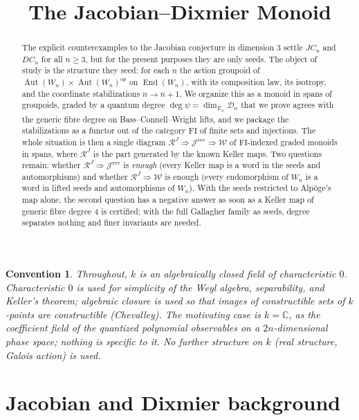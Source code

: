 \documentclass[11pt]{article}
\title{The Jacobian--Dixmier Monoid}
\theoremstyle{change}
\newtheorem{convention}[equation]{Convention}
\theoremstyle{nonumberplain}
\newcommand\cJ{{\mathcal J}}
\newcommand\cW{{\mathcal W}}
\newcommand\cR{{\mathcal R}}
\newcommand\cD{{\mathcal D}}
\newcommand\rev{{\mathrm{rev}}}
\newcommand\FI{{\mathrm{FI}}}
\DeclareMathOperator{\End}{End}
\DeclareMathOperator{\Aut}{Aut}
\begin{document}
\maketitle

\begin{abstract}
The explicit counterexamples to the Jacobian conjecture in dimension $3$ \cite{Alpoge,Speyer,Tao,fam} settle $JC_n$ and $DC_n$ for all $n \geq 3$, but for the present purposes they are only seeds. The object of study is the structure they seed: for each $n$ the action groupoid of $\Aut(W_n) \times \Aut(W_n)^{op}$ on $\End(W_n)$, with its composition law, its isotropy, and the coordinate stabilizations $n \to n+1$. We organize this as a monoid in spans of groupoids, graded by a quantum degree $\deg \psi = \dim_{E_\psi} \cD_n$ that we prove agrees with the generic fibre degree on Bass--Connell--Wright lifts, and we package the stabilizations as a functor out of the category $\FI$ of finite sets and injections. The whole situation is then a single diagram $\cR^J \Rightarrow \cJ^\rev \Rightarrow \cW$ of $\FI$-indexed graded monoids in spans, where $\cR^J$ is the part generated by the known Keller maps. Two questions remain: whether $\cR^J \Rightarrow \cJ^\rev$ is \emph{enough} (every Keller map is a word in the seeds and automorphisms) and whether $\cR^J \Rightarrow \cW$ is enough (every endomorphism of $W_n$ is a word in lifted seeds and automorphisms of $W_n$). With the seeds restricted to Alp\"oge's map alone, the second question has a negative answer as soon as a Keller map of generic fibre degree $4$ is certified; with the full Gallagher family as seeds, degree separates nothing and finer invariants are needed.
\end{abstract}

\begin{convention}\label{conv}
Throughout, $k$ is an algebraically closed field of characteristic $0$. Characteristic $0$ is used for simplicity of the Weyl algebra, separability, and Keller's theorem; algebraic closure is used so that images of constructible sets of $k$-points are constructible (Chevalley). The motivating case is $k = \mathbb{C}$, as the coefficient field of the quantized polynomial observables on a $2n$-dimensional phase space; nothing is specific to it. No further structure on $k$ (real structure, Galois action) is used.
\end{convention}

\section{Jacobian and Dixmier background}
\end{document}

